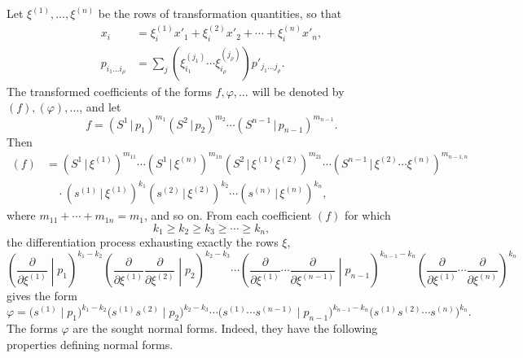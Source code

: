 \documentclass[11pt]{article}
\newcommand{\pair}[2]{(#1\,|\,#2)}
\begin{document}
Let $\xi^{(1)},\ldots,\xi^{(n)}$ be the rows of transformation quantities, so that
\begin{equation}
\begin{aligned}
x_i&=\xi_i^{(1)}x'_1+\xi_i^{(2)}x'_2+\cdots+\xi_i^{(n)}x'_n,\\
p_{i_1\ldots i_\rho}&=\sum_j(\xi_{i_1}^{(j_1)}\cdots \xi_{i_\rho}^{(j_\rho)})p'_{j_1\ldots j_\rho}.
\end{aligned}
\tag{47}
\end{equation}
The transformed coefficients of the forms $f,\varphi,\ldots$ will be denoted by $(f),(\varphi),\ldots$, and let
\[
 f=\pair{S^1}{p_1}^{m_1}\pair{S^2}{p_2}^{m_2}\cdots\pair{S^{n-1}}{p_{n-1}}^{m_{n-1}}.
\]
Then
\begin{equation}
\begin{aligned}
(f)&=\pair{S^1}{\xi^{(1)}}^{m_{11}}\cdots\pair{S^1}{\xi^{(n)}}^{m_{1n}}
\pair{S^2}{\xi^{(1)}\xi^{(2)}}^{m_{21}}\cdots
\pair{S^{n-1}}{\xi^{(2)}\cdots\xi^{(n)}}^{m_{n-1,n}}\\
&\quad\cdot\pair{s^{(1)}}{\xi^{(1)}}^{k_1}\pair{s^{(2)}}{\xi^{(2)}}^{k_2}\cdots\pair{s^{(n)}}{\xi^{(n)}}^{k_n},
\end{aligned}
\tag{48}
\end{equation}
where $m_{11}+\cdots+m_{1n}=m_1$, and so on. From each coefficient $(f)$ for which
\begin{equation}
 k_1\ge k_2\ge k_3\ge\cdots\ge k_n,
\tag{49}
\end{equation}
the differentiation process exhausting exactly the rows $\xi$,
\begin{equation}
\left(\frac{\partial}{\partial\xi^{(1)}}\middle|p_1\right)^{k_1-k_2}
\left(\frac{\partial}{\partial\xi^{(1)}}\frac{\partial}{\partial\xi^{(2)}}\middle|p_2\right)^{k_2-k_3}
\cdots
\left(\frac{\partial}{\partial\xi^{(1)}}\cdots\frac{\partial}{\partial\xi^{(n-1)}}\middle|p_{n-1}\right)^{k_{n-1}-k_n}
\left(\frac{\partial}{\partial\xi^{(1)}}\cdots\frac{\partial}{\partial\xi^{(n)}}\right)^{k_n}
\tag{50}
\end{equation}
gives the form
\begin{equation}
 \varphi=\bigl(s^{(1)}\mid p_1\bigr)^{k_1-k_2}
 \bigl(s^{(1)}s^{(2)}\mid p_2\bigr)^{k_2-k_3}\cdots
 \bigl(s^{(1)}\cdots s^{(n-1)}\mid p_{n-1}\bigr)^{k_{n-1}-k_n}
 \bigl(s^{(1)}s^{(2)}\cdots s^{(n)}\bigr)^{k_n}.
\tag{51}
\end{equation}
The forms $\varphi$ are the sought normal forms. Indeed, they have the following properties defining normal forms.
\end{document}
